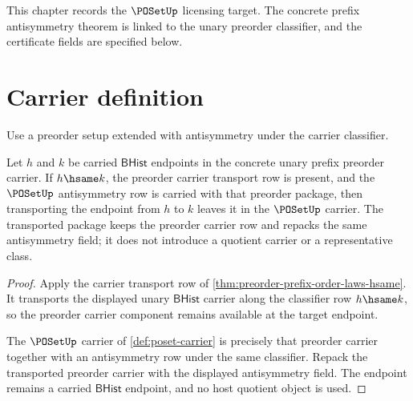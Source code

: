\begin{remark}
\label{rem:concrete-instances-poset-namecert-scope}
This chapter records the \(\POSetUp\) licensing target. The concrete prefix
antisymmetry theorem is linked to the unary preorder classifier, and the
certificate fields are specified below.
\end{remark}

\section{Carrier definition}

\begin{definition}
\label{def:poset-carrier}
Use a preorder setup extended with antisymmetry under the carrier classifier.
\end{definition}

\begin{theorem}
\label{thm:poset-bhist-carrier-transport-obligation}
Let $h$ and $k$ be carried $\mathsf{BHist}$ endpoints in the concrete unary
prefix preorder carrier.  If $h\hsame k$, the preorder carrier transport row
is present, and the $\POSetUp$ antisymmetry row is carried with that preorder
package, then transporting the endpoint from $h$ to $k$ leaves it in the
$\POSetUp$ carrier.  The transported package keeps the preorder carrier row
and repacks the same antisymmetry field; it does not introduce a quotient
carrier or a representative class.
\end{theorem}
\begin{proof}
Apply the carrier transport row of
\autoref{thm:preorder-prefix-order-laws-hsame}.  It transports the displayed
unary $\mathsf{BHist}$ carrier along the classifier row $h\hsame k$, so the
preorder carrier component remains available at the target endpoint.

The $\POSetUp$ carrier of \autoref{def:poset-carrier} is precisely that
preorder carrier together with an antisymmetry row under the same classifier.
Repack the transported preorder carrier with the displayed antisymmetry field.
The endpoint remains a carried $\mathsf{BHist}$ endpoint, and no host quotient
object is used.
\end{proof}

